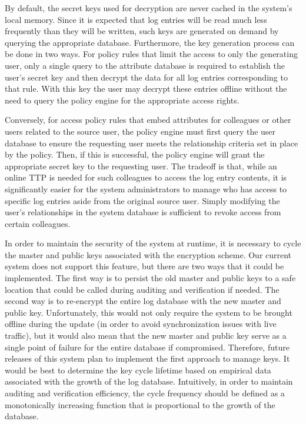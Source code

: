\documentclass{sig-alternate}
\begin{document}
By default, the secret keys used for decryption are never cached in the system's local memory. Since it is
expected that log entries will be read much less frequently than they will be written, such keys are generated
on demand by querying the appropriate database. Furthermore, the key generation process can be done in two ways. 
For policy rules that limit the access to only the generating user, only a single query to the attribute database
is required to establish the user's secret key and then decrypt the data for all log entries corresponding to that rule. 
With this key the user may decrypt these entries offline without the need to query the policy engine for the 
appropriate access rights.

Conversely, for access policy rules that embed attributes for colleagues or other users related to the 
source user, the policy engine must first query the user database to ensure the requesting 
user meets the relationship criteria set in place by the policy. Then,
if this is successful, the policy engine will grant the appropriate secret key to the requesting user. The tradeoff
is that, while an online TTP is needed for such colleagues to access the log entry contents, it is significantly easier
for the system administrators to manage who has access to specific log entries aside from the original source user.
Simply modifying the user's relationships in the system database is sufficient to revoke access from certain colleagues.

In order to maintain the security of the system at runtime, it is necessary to cycle the master and public keys
associated with the encryption scheme. Our current system does not support this feature, but there are two
ways that it could be implemented. The first way is to persist the old master and 
public keys to a safe location that could be called during auditing and verification if needed. The second way is 
to re-encrypt the entire log database with the new master and public key. Unfortunately, this would not only require the system to be 
brought offline during the update (in order to avoid synchronization issues with live traffic), but it would also
mean that the new master and public key serve as a single point of failure for the entire database if compromised. 
Therefore, future releases of this system plan to implement the first approach to manage keys. It would be
best to determine the key cycle lifetime based on empirical data associated with the growth of the log database.
Intuitively, in order to maintain auditing and verification efficiency, the cycle frequency should be defined as 
a monotonically increasing function that is proportional to the growth of the database. 
\end{document}
